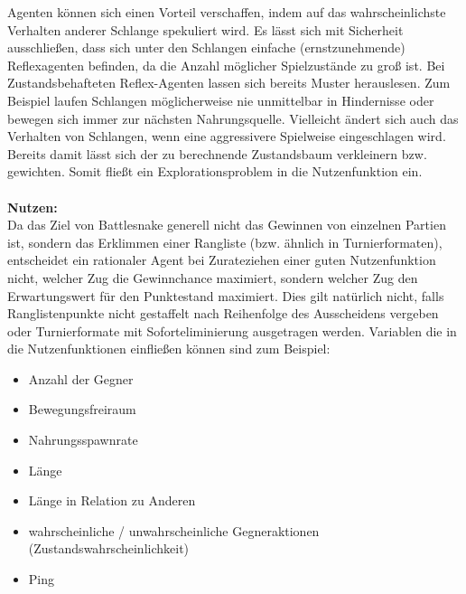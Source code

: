 \documentclass[a4paper,12pt]{article} %
\begin{document}
Agenten können sich einen Vorteil verschaffen, indem auf das wahrscheinlichste Verhalten anderer Schlange spekuliert wird. Es lässt sich mit Sicherheit ausschließen, dass sich unter den Schlangen einfache (ernstzunehmende) Reflexagenten befinden, da die Anzahl möglicher Spielzustände zu groß ist. Bei Zustandsbehafteten Reflex-Agenten lassen sich bereits Muster herauslesen. Zum Beispiel laufen Schlangen möglicherweise nie unmittelbar in Hindernisse oder bewegen sich immer zur nächsten Nahrungsquelle. Vielleicht ändert sich auch das Verhalten von Schlangen, wenn eine aggressivere Spielweise eingeschlagen wird. Bereits damit lässt sich der zu berechnende Zustandsbaum verkleinern bzw. gewichten. Somit fließt ein Explorationsproblem in die Nutzenfunktion ein.\\
\\
\textbf{Nutzen:}\\
Da das Ziel von Battlesnake generell nicht das Gewinnen von einzelnen Partien ist, sondern das Erklimmen einer Rangliste (bzw. ähnlich in Turnierformaten), entscheidet ein rationaler Agent bei Zurateziehen einer guten Nutzenfunktion nicht, welcher Zug die Gewinnchance maximiert, sondern welcher Zug den Erwartungswert für den Punktestand maximiert. Dies gilt natürlich nicht, falls Ranglistenpunkte nicht gestaffelt nach Reihenfolge des Ausscheidens vergeben oder Turnierformate mit Soforteliminierung ausgetragen werden. Variablen die in die Nutzenfunktionen einfließen können sind zum Beispiel:
\begin{itemize}
    \item Anzahl der Gegner
    \item Bewegungsfreiraum
    \item Nahrungsspawnrate
    \item Länge
    \item Länge in Relation zu Anderen
    \item wahrscheinliche / unwahrscheinliche Gegneraktionen (Zustandswahrscheinlichkeit)
    \item Ping
\end{itemize}
\end{document}
